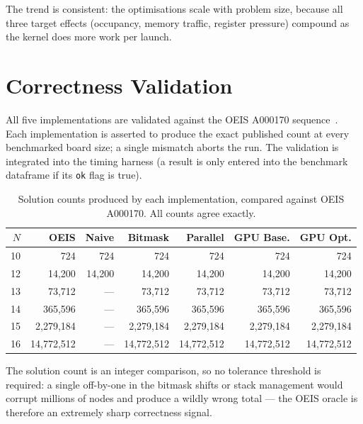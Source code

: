 \documentclass[12pt, letterpaper]{article}
\begin{document}
The trend is consistent: the optimisations scale with problem size, because all three target effects (occupancy, memory traffic, register pressure) compound as the kernel does more work per launch.

\section{Correctness Validation}
\label{sec:correctness}

All five implementations are validated against the OEIS A000170 sequence~\cite{oeisA000170}. Each implementation is asserted to produce the exact published count at every benchmarked board size; a single mismatch aborts the run. The validation is integrated into the timing harness (a result is only entered into the benchmark dataframe if its \texttt{ok} flag is true).

\begin{table}[H]
\centering
\caption{Solution counts produced by each implementation, compared against OEIS A000170. All counts agree exactly.}
\begin{tabular}{@{}rrrrrrr@{}}
\toprule
$N$ & \textbf{OEIS} & \textbf{Naive} & \textbf{Bitmask} & \textbf{Parallel} & \textbf{GPU Base.} & \textbf{GPU Opt.} \\
\midrule
10 &        724 &        724 &        724 &        724 &        724 &        724 \\
12 &     14{,}200 &     14{,}200 &     14{,}200 &     14{,}200 &     14{,}200 &     14{,}200 \\
13 &     73{,}712 &        --- &     73{,}712 &     73{,}712 &     73{,}712 &     73{,}712 \\
14 &    365{,}596 &        --- &    365{,}596 &    365{,}596 &    365{,}596 &    365{,}596 \\
15 &  2{,}279{,}184 &        --- &  2{,}279{,}184 &  2{,}279{,}184 &  2{,}279{,}184 &  2{,}279{,}184 \\
16 & 14{,}772{,}512 &        --- & 14{,}772{,}512 & 14{,}772{,}512 & 14{,}772{,}512 & 14{,}772{,}512 \\
\bottomrule
\end{tabular}
\label{tab:correctness}
\end{table}

The solution count is an integer comparison, so no tolerance threshold is required: a single off-by-one in the bitmask shifts or stack management would corrupt millions of nodes and produce a wildly wrong total --- the OEIS oracle is therefore an extremely sharp correctness signal.
\end{document}

